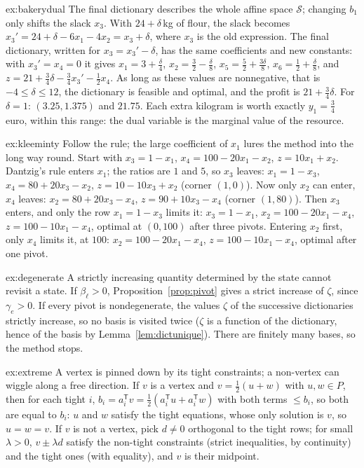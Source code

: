 \begin{solution}{ex:bakerydual}
\idea The final dictionary describes the whole affine space $\mathcal S$; changing $b_1$ only shifts the slack $x_3$.
\writeup With $24+\delta$\,kg of flour, the slack becomes $x_3'=24+\delta-6x_1-4x_2=x_3+\delta$, where $x_3$ is the old expression. The final dictionary, written for $x_3=x_3'-\delta$, has the same coefficients and new constants:
with $x_3'=x_4=0$ it gives $x_1=3+\tfrac\delta4$, $x_2=\tfrac32-\tfrac\delta8$, $x_5=\tfrac52+\tfrac{3\delta}8$, $x_6=\tfrac12+\tfrac\delta8$, and $z=21+\tfrac34\delta-\tfrac34x_3'-\tfrac12x_4$. As long as these values are nonnegative, that is $-4\le\delta\le12$,
the dictionary is feasible and optimal, and the profit is $21+\tfrac34\delta$. For $\delta=1$: $(3.25,1.375)$ and $21.75$. Each extra kilogram is worth exactly $y_1=\tfrac34$ euro, within this range: the dual variable is the marginal value of the resource.
\end{solution}

\begin{solution}{ex:kleeminty}
\idea Follow the rule; the large coefficient of $x_1$ lures the method into the long way round.
\writeup Start with $x_3=1-x_1$, $x_4=100-20x_1-x_2$, $z=10x_1+x_2$. Dantzig's rule enters $x_1$; the ratios are $1$ and $5$, so $x_3$ leaves: $x_1=1-x_3$, $x_4=80+20x_3-x_2$, $z=10-10x_3+x_2$ (corner $(1,0)$). Now only $x_2$ can enter, $x_4$ leaves:
$x_2=80+20x_3-x_4$, $z=90+10x_3-x_4$ (corner $(1,80)$). Then $x_3$ enters, and only the row $x_1=1-x_3$ limits it: $x_3=1-x_1$, $x_2=100-20x_1-x_4$, $z=100-10x_1-x_4$, optimal at $(0,100)$ after three pivots. Entering $x_2$ first, only $x_4$
limits it, at $100$: $x_2=100-20x_1-x_4$, $z=100-10x_1-x_4$, optimal after one pivot.
\end{solution}

\begin{solution}{ex:degenerate}
\idea A strictly increasing quantity determined by the state cannot revisit a state.
\writeup If $\beta_\ell>0$, Proposition~\ref{prop:pivot} gives a strict increase of $\zeta$, since $\gamma_e>0$. If every pivot is nondegenerate, the values $\zeta$ of the successive dictionaries strictly increase, so no basis is visited twice
($\zeta$ is a function of the dictionary, hence of the basis by Lemma~\ref{lem:dictunique}). There are finitely many bases, so the method stops.
\end{solution}

\begin{solution}{ex:extreme}
\idea A vertex is pinned down by its tight constraints; a non-vertex can wiggle along a free direction.
\writeup If $v$ is a vertex and $v=\tfrac12(u+w)$ with $u,w\in P$, then for each tight $i$, $b_i=a_i^{\mathsf T}v=\tfrac12(a_i^{\mathsf T}u+a_i^{\mathsf T}w)$ with both terms $\le b_i$, so both are equal to $b_i$: $u$ and $w$ satisfy the tight equations, whose only solution is $v$,
so $u=w=v$. If $v$ is not a vertex, pick $d\ne0$ orthogonal to the tight rows; for small $\lambda>0$, $v\pm\lambda d$ satisfy the non-tight constraints (strict inequalities, by continuity) and the tight ones (with equality), and $v$ is their midpoint.
\end{solution}

